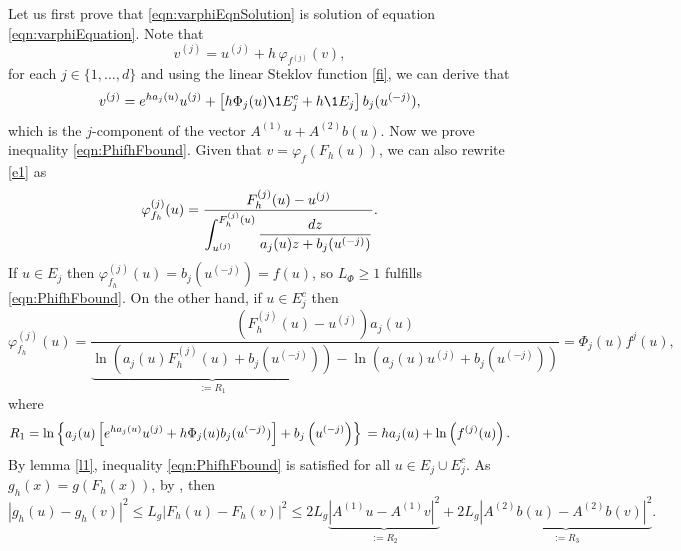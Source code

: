 \documentclass[sort&compress, preprint]{elsarticle}
\theoremstyle{definition}
\theoremstyle{plain}%
\theoremstyle{remark}
\begin{document}
\begin{pf}
	Let us first prove that \eqref{eqn:varphiEqnSolution} is solution 
	of equation \eqref{eqn:varphiEquation}.  Note that 
	\begin{equation}\label{e1}
		v^{(j)} = u^{(j)} + h \,\varphi_{f^{(j)}}(v),	
	\end{equation}
	for each $j\in \{1,\dots, d\}$ and using the linear Steklov function \eqref{fi}, 
	 we can derive that
	\begin{equation}
		v^{(j)}= e^{h a_j(u)} u^{(j)} + 
		\left[
			h\Phi_j(u)
			\1{E_j^c}
			+h \1{E_j}
		\right]b_{j}(u^{(-j)}),
	\end{equation}	
	 which is the $j$-component of the vector
	$A^{(1)}u +A^{(2)} b(u)$. Now we prove inequality \eqref{eqn:PhifhFbound}. Given that 
	$v =\varphi_{f}(F_h(u))$, 
	we can also rewrite \eqref{e1} as
	$$
		\varphi_{f_h}^{(j)}(u) = 
			\frac{
				F_h^{(j)}(u)-u^{(j)}
			}%
			{%
				\displaystyle
				\int_{u^{(j)}}^{F_h^{(j)}(u)}
				\frac{dz}{a_j(u)z + b_j(u^{(-j)})}
			}.
	$$
	If $u\in E_j$ then $\varphi_{f_h}^{(j)}(u) = b_j(u^{(-j)}) = f(u)$,
	so $L_{\Phi}\geq 1$ fulfills  \eqref{eqn:PhifhFbound}.
	On the other hand, if $u\in E_j^c$ then
	\begin{equation}\label{eqn:VarPhiEjc}
		\varphi_{f_h}^{(j)}(u) =
		\frac{
				(F_h^{(j)}(u)-u^{(j)}) a_j(u)
			}
			{
				\underbrace{
				\ln \left(
					a_j(u) F_h^{(j)}(u) + b_j(u^{(-j)})
				\right)
				}_{:=R_1}
				-
				\ln \left(
					a_j(u) u^{(j)} + b_j(u^{(-j)})
				\right)
			}=\Phi_j(u)f^j(u),		
	\end{equation}
	 where
	\begin{equation}\label{eqn:Ter1Simplification}	
		R_1=
			\ln\left\{
				a_j(u)\left[
					e^{ha_j(u)}u^{(j)} +
					h\Phi_j(u) b_j(u^{(-j)})	
				\right]
				+b_j\left(u^{(-j)}\right)
			\right\} \notag \\
		=h a_j(u) + \ln \left( f^{(j)}(u) \right).		
	\end{equation}
	By lemma \ref{l1}, inequality \eqref{eqn:PhifhFbound} is satisfied 
	for all $u\in E_j \cup E_j^c$. 	As $g_h(x)=g\left(F_h(x) \right)$, 
	by , then
	\begin{equation} \label{eqn:gLocalLipschitzArg} 
		|g_h(u)-g_h(v)|^2 \leq
			L_g|F_h(u)- F_h(v)|^2  \leq
			2L_g \underbrace{
				|A^{(1)}u - A^{(1)}v|^2 
			}_{:=R_2} +
			2L_g \underbrace{
				|A^{(2)}b(u) - A^{(2)}b(v) |^2 
			}_{:=R_3}.			
	\end{equation}

\end{pf}
\end{document}
